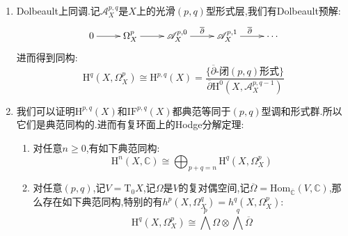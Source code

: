 \begin{enumerate}
    \item Dolbeault上同调.记$\mathscr{A}_X^{p,q}$是$X$上的光滑$(p,q)$型形式层,我们有Dolbeault预解:
    $$\xymatrix{0\ar[r]&\Omega_X^p\ar[r]&\mathscr{A}_X^{p,0}\ar[r]^{\overline{\partial}}&\mathscr{A}_X^{p,1}\ar[r]^{\overline{\partial}}&\cdots}$$
    进而得到同构:
    $$\mathrm{H}^q(X,\Omega_X^p)\cong\mathrm{H}^{p,q}(X)=\frac{\{\overline{\partial}\text{-闭}(p,q)\text{形式}\}}{\overline{\partial}\mathrm{H}^0(X,\mathscr{A}_X^{p,q-1})}$$
    \item 我们可以证明$\mathrm{H}^{p,q}(X)$和$\mathrm{IF}^{p,q}(X)$都典范等同于$(p,q)$型调和形式群.所以它们是典范同构的.进而有复环面上的Hodge分解定理:
    \begin{enumerate}[(1)]
    	\item 对任意$n\ge0$,有如下典范同构:
    	$$\mathrm{H}^n(X,\mathbb{C})\cong\bigoplus_{p+q=n}\mathrm{H}^q(X,\Omega_X^p)$$
    	\item 对任意$(p,q)$,记$V=\mathrm{T}_0X$,记$\Omega$是$V$的复对偶空间,记$\overline{\Omega}=\mathrm{Hom}_{\overline{\mathbb{C}}}(V,\mathbb{C})$,那么存在如下典范同构,特别的有$h^p(X,\Omega_X^q)=h^q(X,\Omega_X^p)$:
    	$$\mathrm{H}^q(X,\Omega_X^p)\cong\bigwedge^p\Omega\otimes\bigwedge^q\overline{\Omega}$$
    \end{enumerate}
\end{enumerate}

